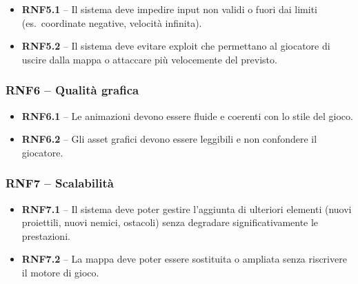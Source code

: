 \documentclass[12pt,a4paper]{article}
\newcommand{\req}[2]{%
  \noindent\textbf{#1} -- #2\par\smallskip
}
\begin{document}
\begin{small}
\begin{itemize}[leftmargin=2em]
  \item \req{RNF5.1}{Il sistema deve impedire input non validi o fuori dai limiti
    (es.\ coordinate negative, velocità infinita).}
  \item \req{RNF5.2}{Il sistema deve evitare exploit che permettano al giocatore di uscire dalla
    mappa o attaccare più velocemente del previsto.}
\end{itemize}

\subsubsection{RNF6 – Qualità grafica}

\begin{itemize}[leftmargin=2em]
  \item \req{RNF6.1}{Le animazioni devono essere fluide e coerenti con lo stile del gioco.}
  \item \req{RNF6.2}{Gli asset grafici devono essere leggibili e non confondere il giocatore.}
\end{itemize}

\subsubsection{RNF7 – Scalabilità}

\begin{itemize}[leftmargin=2em]
  \item \req{RNF7.1}{Il sistema deve poter gestire l'aggiunta di ulteriori elementi (nuovi
    proiettili, nuovi nemici, ostacoli) senza degradare significativamente le prestazioni.}
  \item \req{RNF7.2}{La mappa deve poter essere sostituita o ampliata senza riscrivere il motore
    di gioco.}
\end{itemize}
\end{small}
\end{document}
